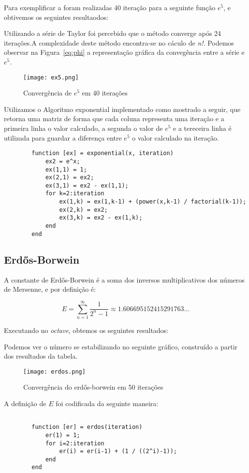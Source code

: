 		Para exemplificar a foram realizadas 40 iteração para a seguinte função
		$e^5$, e obtivemos os seguintes resultaodos:

		

		Utilizando a série de Taylor foi percebido que o método converge após 24
		iterações.A complexidade deste método encontra-se no cáculo de
		\emph{n!}.  Podemos observar na Figura~\ref{eq:phi} a representação
		gráfica da convegência entre a série e $e^5$. 

		\begin{figure}[H] \centering
			\texttt{[image: ex5.png]} 
		\caption{Convergência de $e^5$ em 40 iterações}
		\label{ex5} 
		\end{figure}

		Utilizamos o Algoritmo exponential implementado como mostrado a seguir,
		que retorna uma matriz de forma que cada coluna representa uma iteração
		e a primeira linha o valor calculado, a segunda o valor de $e^5$ e a
		tereceira linha é utilizada para guardar a diferença entre $e^5$ o valor
		calculado na iteração.

		\begin{lstlisting}
		function [ex] = exponential(x, iteration)
			ex2 = e^x;
			ex(1,1) = 1;
			ex(2,1) = ex2;
			ex(3,1) = ex2 - ex(1,1);
			for k=2:iteration
				ex(1,k) = ex(1,k-1) + (power(x,k-1) / factorial(k-1));
				ex(2,k) = ex2;
				ex(3,k) = ex2 - ex(1,k);
			end
		end
		\end{lstlisting}

	\subsection{Erdős-Borwein}

		A constante de Erdős-Borwein é a soma dos inversos multiplicativos dos
		números de Mersenne, e por definição é:

		\begin{equation}
			E = \displaystyle\sum_{n=1}^{\infty} \frac{1}{2^n-1} \approx 1.606695152415291763\dots
		\end{equation}

		Executando no \emph{octave}, obtemos os seguintes resultados:

		

		Podemos ver o número se estabilizando no seguinte gráfico,
		construído a partir dos resultados da tabela.

		\begin{figure}[H]
			\centering
			\texttt{[image: erdos.png]}
			\caption{Convergência do erdős-borwein em 50 iterações}
			\label{erdos_graphic}
		\end{figure}

		A definição de $E$ foi codificada da seguinte maneira:

		\begin{lstlisting}

		function [er] = erdos(iteration)
			er(1) = 1;
			for i=2:iteration
				er(i) = er(i-1) + (1 / ((2^i)-1));
			end
		end

		\end{lstlisting}
